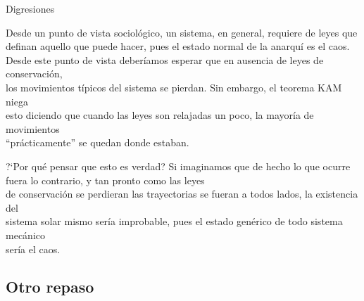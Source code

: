 \documentclass[8pt]{beamer}
\renewcommand{\>}{\rangle}
\newcommand{\<}{\langle}
\begin{document}
\begin{frame}{Digresiones}

\begin{mybluebox}{}
Desde un punto de vista sociológico, un sistema, en general, requiere de leyes que\\[2pt] definan aquello que puede hacer, pues el estado normal de la anarquí es el caos.\\[2pt] Desde este punto de vista deberíamos esperar que en ausencia de leyes de conservación,\\[2pt] los movimientos típicos del sistema se pierdan. Sin embargo, el teorema KAM niega\\[2pt] esto diciendo que cuando las leyes son relajadas un poco, la mayoría de movimientos\\[2pt] ``prácticamente'' se quedan donde estaban.
\end{mybluebox}

\begin{mybluebox}{?`Por qué pensar que esto es verdad?}
Si imaginamos que de hecho lo que ocurre fuera lo contrario, y tan pronto como las leyes\\[2pt] de conservación se perdieran las trayectorias se fueran a todos lados, la existencia del\\[2pt] sistema solar mismo sería improbable, pues el estado genérico de todo sistema mecánico\\[2pt] sería el caos.
\end{mybluebox}

\end{frame}

\subsection[Otro repaso]{Otro repaso}
\end{document}
